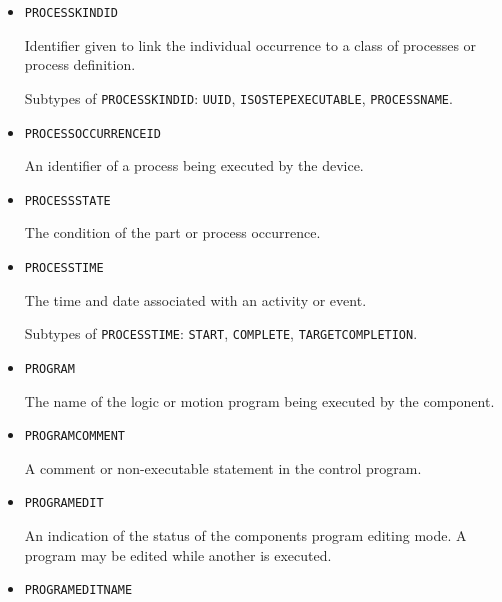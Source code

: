 \begin{itemize}
Identifier given to link the individual occurrence to a group of related occurrences, such as a process step in a process plan.

Subtypes of \texttt{PROCESS\textunderscore AGGREGATE\textunderscore ID}: \texttt{ORDER\textunderscore NUMBER}, \texttt{PROCESS\textunderscore STEP}, \texttt{PROCESS\textunderscore PLAN}.

\item \texttt{PROCESS\textunderscore KIND\textunderscore ID}  

Identifier given to link the individual occurrence to a class of processes or process definition.


Subtypes of \texttt{PROCESS\textunderscore KIND\textunderscore ID}: \texttt{UUID}, \texttt{ISO\textunderscore STEP\textunderscore EXECUTABLE}, \texttt{PROCESS\textunderscore NAME}.

\item \texttt{PROCESS\textunderscore OCCURRENCE\textunderscore ID}  

An identifier of a process being executed by the device.


\item \texttt{PROCESS\textunderscore STATE}  

The condition of the part or process occurrence.


\item \texttt{PROCESS\textunderscore TIME}  

The time and date associated with an activity or event.

Subtypes of \texttt{PROCESS\textunderscore TIME}: \texttt{START}, \texttt{COMPLETE}, \texttt{TARGET\textunderscore COMPLETION}.

\item \texttt{PROGRAM}  

The name of the logic or motion program being executed by the  component.


\item \texttt{PROGRAM\textunderscore COMMENT}  

A comment or non-executable statement in the control program.


\item \texttt{PROGRAM\textunderscore EDIT}  

An indication of the status of the  components program editing mode. A program may be edited while another is executed.


\item \texttt{PROGRAM\textunderscore EDIT\textunderscore NAME}  


\end{itemize}
